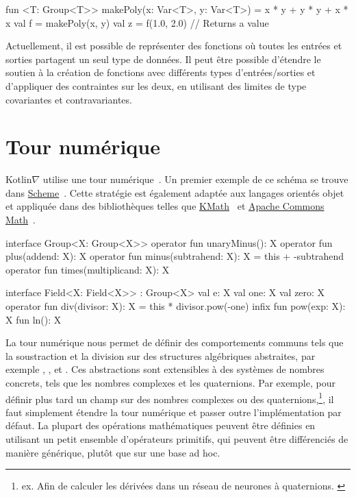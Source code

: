 \begin{kotlinlisting}
fun <T: Group<T>> makePoly(x: Var<T>, y: Var<T>) = x * y + y * y + x * x
val f = makePoly(x, y)
val z = f(1.0, 2.0) // Returns a value
\end{kotlinlisting}
%
Actuellement, il est possible de représenter des fonctions où toutes les entrées et sorties partagent un seul type de données. Il peut être possible d'étendre le soutien à la création de fonctions avec différents types d'entrées/sorties et d'appliquer des contraintes sur les deux, en utilisant des limites de type covariantes et contravariantes.

\section{Tour numérique}\label{sec:numeric-tower}

Kotlin$\nabla$ utilise une tour numérique~\citep{st2012typing}. Un premier exemple de ce schéma se trouve dans \href{https://www.gnu.org/software/guile/manual/html_node/Numerical-Tower.html}{Scheme}~\citep{sperber2009revised}. Cette stratégie est également adaptée aux langages orientés objet~\citep{niculescu2003design, niculescu2011using, kennedy2005generalized} et appliquée dans des bibliothèques telles que \href{https://github.com/mipt-npm/kmath}{KMath}~\citep{nozik2019kmath} et \href{https://commons.apache.org/proper/commons-math/}{Apache Commons Math}~\citep{developers2012apache}.

\begin{kotlinlisting}
interface Group<X: Group<X>> {
    operator fun unaryMinus(): X
    operator fun plus(addend: X): X
    operator fun minus(subtrahend: X): X = this + -subtrahend
    operator fun times(multiplicand: X): X
}

interface Field<X: Field<X>> : Group<X> {
    val e: X
    val one: X
    val zero: X
    operator fun div(divisor: X): X = this * divisor.pow(-one)
    infix fun pow(exp: X): X
    fun ln(): X
}
\end{kotlinlisting}
%
La tour numérique nous permet de définir des comportements communs tels que la soustraction et la division sur des structures algébriques abstraites, par exemple , , et . Ces abstractions sont extensibles à des systèmes de nombres concrets, tels que les nombres complexes et les quaternions. Par exemple, pour définir plus tard un champ sur des nombres complexes ou des quaternions,\hspace{-.08em}\footnote{ex. Afin de calculer les dérivées dans un réseau de neurones à quaternions. \citep{isokawa2003quaternion}}, il faut simplement étendre la tour numérique et passer outre l'implémentation par défaut. La plupart des opérations mathématiques peuvent être définies en utilisant un petit ensemble d'opérateurs primitifs, qui peuvent être différenciés de manière générique, plutôt que sur une base ad hoc.

